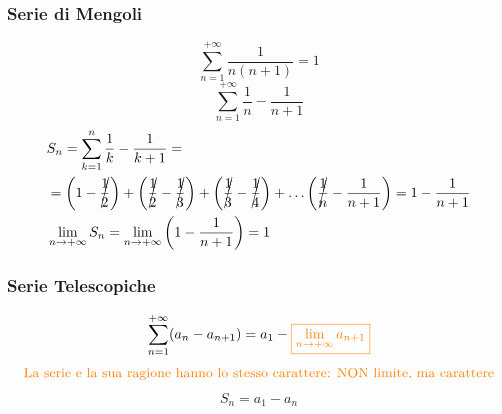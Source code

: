 
\subsubsection{Serie di Mengoli}
\[ \sum_{n=1}^{+\infty} \frac{1}{n(n+1)}=1 \]
\[ \sum_{n=1}^{+\infty} \frac{1}{n}-\frac{1}{n+1} \]
\begin{align*}
    & S_{n}=\sum_{k=1}^{n} \frac{1}{k}-\frac{1}{k+1}=\\
    & = \left( 1 -\cancel{ \frac{1}{2} }\right) + \left( \cancel{ \frac{1}{2} } -\cancel{ \frac{1}{3} } \right) + \left( \cancel{ \frac{1}{3} } -\cancel{ \frac{1}{4} } \right) + \dots \left( \cancel{ \frac{1}{n} } -\frac{1}{n+1} \right)= 1- \frac{1}{n+1}\\
    & \lim_{n \to +\infty} S_n = \lim_{n \to +\infty} \left( 1 - \frac{1}{n+1} \right) = 1
\end{align*}

\subsubsection{Serie Telescopiche}
\[ \sum_{n=1}^{+\infty} (a_{n}-a_{n+1})=a_{1}-\textcolor{orange}{\boxed{\lim_{ n \to +\infty } a_{n+1}}} \]
\[ \textcolor{orange}{\text{La serie e la sua ragione hanno lo stesso carattere: NON limite, ma carattere}} \]
\[ S_{n}=a_{1}-a_{n} \]

